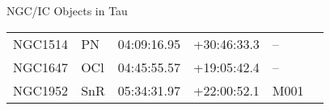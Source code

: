 \begin{block}{NGC/IC Objects in Tau}
  \centering
  \begin{tabularx}{\textwidth}{llrrll} 
    NGC1514 & PN & 04:09:16.95 & +30:46:33.3  & -- \\ 
    NGC1647 & OCl & 04:45:55.57 & +19:05:42.4  & -- \\ 
    NGC1952 & SnR & 05:34:31.97 & +22:00:52.1  & M001 \\ 
  \end{tabularx}
\end{block}
